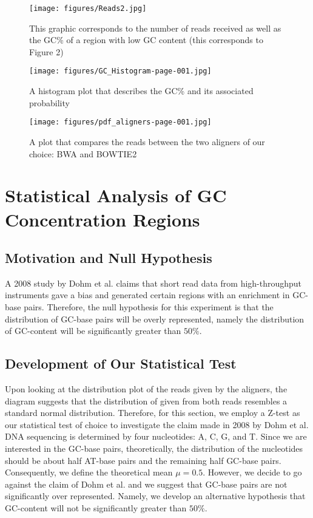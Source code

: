 \documentclass[12pt]{article}
\begin{document}
\begin{figure}
    \centering
    \texttt{[image: figures/Reads2.jpg]}
    \caption{This graphic corresponds to the number of reads received as well as the GC\% of a region with low GC content (this corresponds to Figure 2)}
    \label{Figure 3}
\end{figure}


\begin{figure}
    \centering
    \texttt{[image: figures/GC\_Histogram-page-001.jpg]}
    \caption{A histogram plot that describes the GC\% and its associated probability}
    \label{Figure 3}

    \texttt{[image: figures/pdf\_aligners-page-001.jpg]}
    \caption{A plot that compares the reads between the two aligners of our choice: BWA and BOWTIE2}
    \label{Figure 4}
\end{figure}


%
%

\newpage

\section{Statistical Analysis of GC Concentration Regions}

\subsection{Motivation and Null Hypothesis}
{A 2008 study by Dohm et al. claims that short read data from high-throughput instruments gave a bias and generated certain regions with an enrichment in GC-base pairs. Therefore, the null hypothesis for this experiment is that the distribution of GC-base pairs will be overly represented, namely the distribution of GC-content will be significantly greater than $50\%$.}

\subsection{Development of Our Statistical Test}
{Upon looking at the distribution plot of the reads given by the aligners, the diagram suggests that the distribution of given from both reads resembles a standard normal distribution. Therefore, for this section, we employ a Z-test as our statistical test of choice to investigate the claim made in 2008 by Dohm et al. DNA sequencing is determined by four nucleotides: A, C, G, and T. Since we are interested in the GC-base pairs, theoretically, the distribution of the nucleotides should be about half AT-base pairs and the remaining half GC-base pairs. Consequently, we define the theoretical mean $\mu=0.5$. However, we decide to go against the claim of Dohm et al. and we suggest that GC-base pairs are not significantly over represented. Namely, we develop an alternative hypothesis that GC-content will not be significantly greater than $50\%$.}
\end{document}
